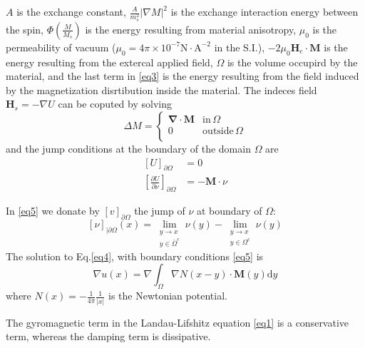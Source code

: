 \documentclass{article}
\begin{document}
$A$ is the exchange constant, $\displaystyle\frac{A}{m_s^2}\left|\nabla M\right|^2$ is the exchange interaction energy between the spin, $\displaystyle \Phi\left(\frac{M}{M_s}\right)$ is the energy resulting from material anisotropy, $\mu_0$ is the permeability of vacuum ($\displaystyle\mu_0=4\pi\times10^{-7}\mathrm{N}\cdot \mathrm{A}^{-2}$ in the S.I.), $-2\mu_0\bm{H}_e\cdot \bm{M}$ is the energy resulting from the extercal applied field, $\Omega$ is the volume occupird by the material, and the last term in \eqref{eq3} is the energy resulting from the field induced by the magnetization disrtibution inside the material. The indeces field $\bm{H}_s=-\nabla U$ can be coputed by solving
\begin{equation}
\Delta M=\left\{\begin{array}{ll}
\bm{\nabla}\cdot \bm{M} & \text{in}\,\Omega \\ 
0 & \text{outside}\,\Omega \\ 
\end{array} \right.\label{eq4}
\end{equation}
and the jump conditions at the boundary of the domain $\Omega$ are
\begin{equation}
\begin{split}
\left[U\right]_{\partial \Omega}&=0 \\
\left[\frac{\partial U}{\partial \nu}\right]_{\partial \Omega}&=-\bm{M}\cdot \nu\label{eq5}
\end{split}
\end{equation}

In \eqref{eq5} we donate by $\displaystyle\left[v\right]_{\partial \Omega}$ the jump of $\nu$ at boundary of $\Omega$:
\begin{equation}
\left[\nu\right]_{|\partial \Omega}\left(x\right)=\lim_{\substack{y \to x\\y\in\bar{\Omega}^c}}\nu\left(y\right)-\lim_{\substack{y \to x\\y\in\Omega^c}}\nu\left(y\right)\label{eq6}
\end{equation}
The solution to Eq.\eqref{eq4}, with boundary conditions \eqref{eq5} is
\begin{equation}
\nabla u\left(x\right)=\nabla \int_\Omega \nabla N\left(x-y\right)\cdot \bm{M}\left(y\right)\mathrm{d} y\label{eq7}
\end{equation}
where $\displaystyle N\left(x\right)=-\frac{1}{4\pi}\frac{1}{\left|x\right|}$ is the Newtonian potential.

The gyromagnetic term in the Landau-Lifshitz equation \eqref{eq1} is a conservative term,
whereas the damping term is dissipative.
\end{document}
